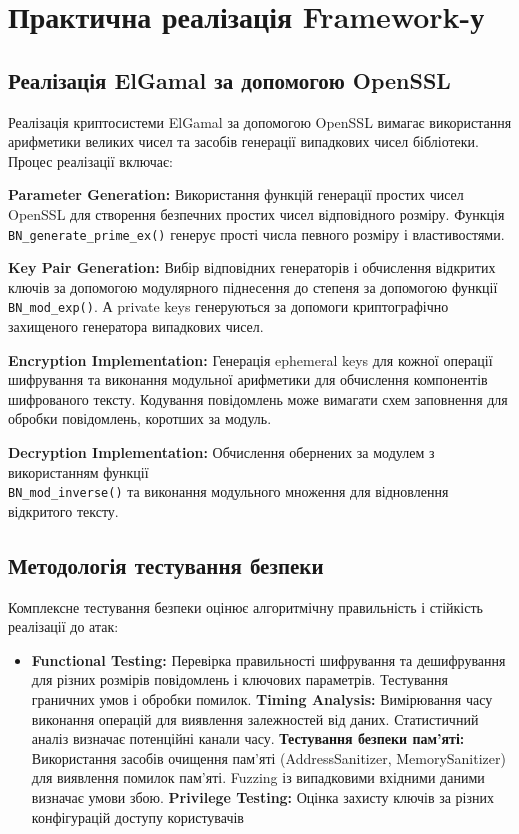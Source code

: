 \section{Практична реалізація Framework-у}

\subsection{Реалізація ElGamal за допомогою OpenSSL}

Реалізація криптосистеми ElGamal за допомогою OpenSSL вимагає використання арифметики великих чисел та засобів генерації 
випадкових чисел бібліотеки. Процес реалізації включає:

\textbf{Parameter Generation:} Використання функцій генерації простих чисел OpenSSL для створення безпечних простих 
чисел відповідного розміру. Функція \texttt{BN\_generate\_prime\_ex()} генерує прості числа певного розміру і властивостями.

\textbf{Key Pair Generation:} Вибір відповідних генераторів і обчислення відкритих ключів за допомогою модулярного 
піднесення до степеня за допомогою функції \texttt{BN\_mod\_exp()}. А private keys генеруються за допомоги 
криптографічно захищеного генератора випадкових чисел.

\textbf{Encryption Implementation:} Генерація ephemeral keys для кожної операції шифрування та виконання модульної 
арифметики для обчислення компонентів шифрованого тексту. Кодування повідомлень може вимагати схем заповнення для 
обробки повідомлень, коротших за модуль.

\textbf{Decryption Implementation:} Обчислення обернених за модулем з використанням функції \\ 
\texttt{BN\_mod\_inverse()} та виконання модульного множення для відновлення відкритого тексту.

\subsection{Методологія тестування безпеки}

Комплексне тестування безпеки оцінює алгоритмічну правильність і стійкість реалізації до атак:
\begin{itemize}
    \item 
    \textbf{Functional Testing:} Перевірка правильності шифрування та дешифрування для різних розмірів повідомлень 
        і ключових параметрів. Тестування граничних умов і обробки помилок.
    \textbf{Timing Analysis:} Вимірювання часу виконання операцій для виявлення залежностей від даних. Статистичний 
        аналіз визначає потенційні канали часу.
    \textbf{Тестування безпеки пам'яті:} Використання засобів очищення пам'яті (AddressSanitizer, MemorySanitizer) 
        для виявлення помилок пам'яті. Fuzzing із випадковими вхідними даними визначає умови збою.
    \textbf{Privilege Testing:} Оцінка захисту ключів за різних конфігурацій доступу користувачів
\end{itemize}

